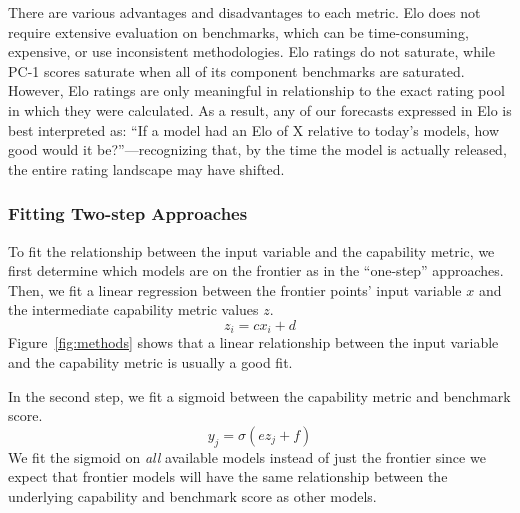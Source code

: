 There are various advantages and disadvantages to each metric. Elo does not require extensive evaluation on benchmarks, which can be time-consuming, expensive, or use inconsistent methodologies. Elo ratings do not saturate, while PC-1 scores saturate when all of its component benchmarks are saturated.
However, Elo ratings are only meaningful in relationship to the exact rating pool in which they were calculated. As a result, any of our forecasts expressed in Elo is best interpreted as: “If a model had an Elo of X relative to today’s models, how good would it be?”—recognizing that, by the time the model is actually released, the entire rating landscape may have shifted.


\subsubsection{Fitting Two-step Approaches}


To fit the relationship between the input variable and the capability metric, we first determine which models are on the frontier as in the ``one-step'' approaches. Then, we fit a linear regression between the frontier points' input variable $x$ and the intermediate capability metric values $z$.
\begin{equation}\label{eq:linear}
    z_i = c x_i + d
\end{equation}
Figure~\ref{fig:methods} shows that a linear relationship between the input variable and the capability metric is usually a good fit.

In the second step, we fit a sigmoid between the capability metric and benchmark score.  
\begin{equation}\label{eq:sigmoid}
    y_j = \sigma(e z_j + f)
\end{equation}
We fit the sigmoid on \emph{all} available models instead of just the frontier since we expect that frontier models will have the same relationship between the underlying capability and benchmark score as other models. 
